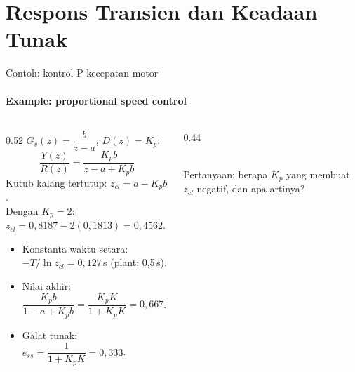 \documentclass[aspectratio=169,10pt]{beamer}
\begin{document}
\section{Respons Transien dan Keadaan Tunak\texorpdfstring{\\[4pt]{\Large{}}}{ / Transient and Steady-State Response}}

\begin{frame}{Contoh: kontrol P kecepatan motor}
	\framesubtitle{Example: proportional speed control}
	\begin{columns}[c]
		\begin{column}{0.52\textwidth}
			\small
			$G_v(z) = \dfrac{b}{z-a}$, $D(z)=K_p$:
			\[
				\frac{Y(z)}{R(z)} = \frac{K_pb}{z - a + K_pb}
			\]
			Kutub kalang tertutup: $z_{cl} = a - K_pb$.\\[3pt]
			Dengan $K_p = 2$: $z_{cl} = 0{,}8187 - 2(0{,}1813) = 0{,}4562$.
			\begin{itemize}
				\item Konstanta waktu setara: $-T/\ln z_{cl} = 0{,}127$\,s (plant: 0,5\,s).
				\item Nilai akhir: $\dfrac{K_pb}{1-a+K_pb} = \dfrac{K_pK}{1+K_pK} = 0{,}667$.
				\item Galat tunak: $e_{ss} = \dfrac{1}{1+K_pK} = 0{,}333$.
			\end{itemize}
		\end{column}
		\begin{column}{0.44\textwidth}
			\centering
			\\
			{\scriptsize Pertanyaan: berapa $K_p$ yang membuat $z_{cl}$ negatif, dan apa artinya?}
		\end{column}
	\end{columns}
\end{frame}
\end{document}
